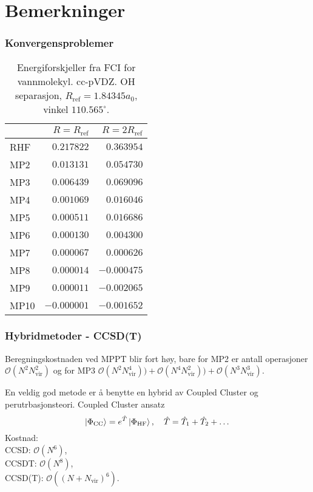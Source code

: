 \documentclass{beamer}
\begin{document}
\section{Bemerkninger}

\begin{frame}
	\frametitle{Konvergensproblemer}
	
	\begin{table}
		\begin{tabular}{l r r} \hline
			& $R = R_{\text{ref}}$ & $R = 2R_{\text{ref}}$ \\ \hline
			RHF & $0.217822$  & $0.363954$ \\
			MP2 & $0.013131$  & $0.054730$ \\
			MP3 & $0.006439$& $0.069096$ \\
			MP4 & $0.001069$& $0.016046$ \\
			MP5 & $0.000511$ & $0.016686$ \\
			MP6 & $0.000130$ & $0.004300$ \\
			MP7 & $0.000067$ & $0.000626$ \\
			MP8 & $0.000014$ & $-0.000475$ \\
			MP9 & $0.000011$ & $-0.002065$ \\
			MP10&$-0.000001$&$-0.001652$ \\ \hline
		\end{tabular}
		\caption{Energiforskjeller fra FCI for vannmolekyl. cc-pVDZ. OH separasjon, $R_\text{ref}=1.843
		45a_0$, vinkel $110.565^\circ$.}
	\end{table}
	
\end{frame}

\begin{frame}
	\frametitle{Hybridmetoder - CCSD(T)}
	
		Beregningskostnaden ved MPPT blir fort høy, bare for MP2 er antall operasjoner $\mathcal{O}(N^2N_\text{vir}^2)$ og for MP3 $\mathcal{O}(N^2N_\text{vir}^4)) + \mathcal{O}(N^4N_\text{vir}^2)) + \mathcal{O}(N^3N_\text{vir}^3)$.
	
	En veldig god metode er å benytte en hybrid av Coupled Cluster og perutrbasjonsteori. Coupled Cluster ansatz
	\begin{equation}
		\ket{\Phi_\text{CC}} = e^{\hat T}\ket{\Phi_\text{HF}}, \quad \hat T = \hat T_1 + \hat T_2 + \dots
	\end{equation}
	Kostnad: 
	\\CCSD:  $\mathcal{O}(N^6)$, \\ CCSDT: $\mathcal{O}(N^8)$, \\ CCSD(T): $\mathcal{O}((N + N_\text{vir})^6)$.
	
	
\end{frame}
\end{document}
